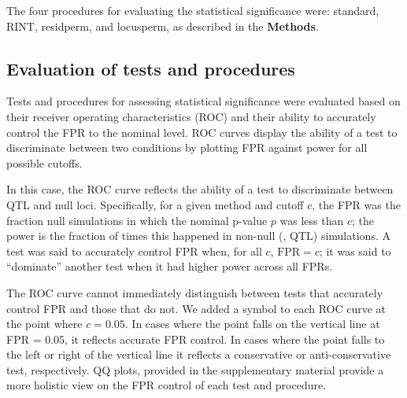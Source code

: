 The four procedures for evaluating the statistical significance were: standard, RINT, residperm, and locusperm, as described in the \textbf{Methods}.

\subsection{Evaluation of tests and procedures}

Tests and procedures for assessing statistical significance were evaluated based on their receiver operating characteristics (ROC) and their ability to accurately control the FPR to the nominal level. 
ROC curves display the ability of a test to discriminate between two conditions by plotting FPR against power for all possible cutoffs.

In this case, the ROC curve reflects the ability of a test to discriminate between QTL and null loci.
Specifically, for a given method and cutoff $c$, the FPR was the fraction null simulations in which the nominal p-value $p$ was less than $c$; the power is the fraction of times this happened in non-null (\ie, QTL) simulations.
A test was said to accurately control FPR when, for all $c$, $\text{FPR} = c$; it was said to ``dominate'' another test when it had higher power across all FPRs.

The ROC curve cannot immediately distinguish between tests that accurately control FPR and those that do not.
We added a symbol to each ROC curve at the point where $c = 0.05$.
In cases where the point falls on the vertical line at FPR = 0.05, it reflects accurate FPR control.
In cases where the point falls to the left or right of the vertical line it reflects a conservative or anti-conservative test, respectively.
QQ plots, provided in the supplementary material provide a more holistic view on the FPR control of each test and procedure.

